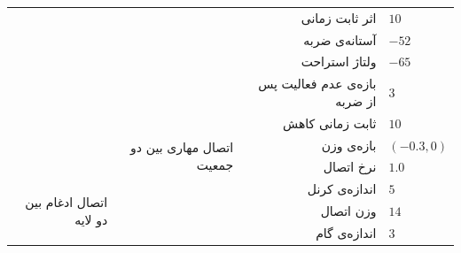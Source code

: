 \documentclass[12pt]{report}
\begin{document}
\begin{table}[p]
{\begin{tabular}{|rrrl|}
\multicolumn{1}{|r|}{}                                          & \multicolumn{1}{r|}{}                                          & \multicolumn{1}{r|}{اثر ثابت زمانی}               & $10$                      \\ \cline{3-4} 
\multicolumn{1}{|r|}{}                                          & \multicolumn{1}{r|}{}                                          & \multicolumn{1}{r|}{آستانه‌ی ضربه}                & $-52$                     \\ \cline{3-4} 
\multicolumn{1}{|r|}{}                                          & \multicolumn{1}{r|}{}                                          & \multicolumn{1}{r|}{ولتاژ استراحت}                & $-65$                     \\ \cline{3-4} 
\multicolumn{1}{|r|}{}                                          & \multicolumn{1}{r|}{}                                          & \multicolumn{1}{r|}{بازه‌ی عدم فعالیت پس از ضربه} & $3$                       \\ \cline{3-4} 
\multicolumn{1}{|r|}{}                                          & \multicolumn{1}{r|}{}                                          & \multicolumn{1}{r|}{ثابت زمانی کاهش}              & $10$                      \\ \cline{2-4} 
\multicolumn{1}{|r|}{}                                          & \multicolumn{1}{r|}{\multirow{2}{*}{اتصال مهاری بین دو جمعیت}} & \multicolumn{1}{r|}{بازه‌ی وزن}                   & $(-0.3,0)$                \\ \cline{3-4} 
\multicolumn{1}{|r|}{}                                          & \multicolumn{1}{r|}{}                                          & \multicolumn{1}{r|}{نرخ اتصال}                    & $1.0$                     \\ \hline
\multicolumn{1}{|r|}{\multirow{3}{*}{اتصال ادغام بین دو لایه}} & \multicolumn{2}{r|}{اندازه‌ی کرنل}                                                                                 & $5$                       \\ \cline{2-4} 
\multicolumn{1}{|r|}{}                                          & \multicolumn{2}{r|}{وزن اتصال}                                                                                     & $14$                      \\ \cline{2-4} 
\multicolumn{1}{|r|}{}                                          & \multicolumn{2}{r|}{اندازه‌ی گام}                                                                                  & $3$                       \\ \hline

\end{tabular}}
\end{table}
\end{document}
